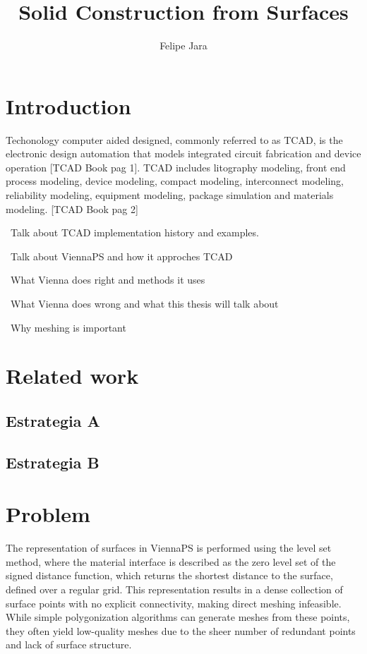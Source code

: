 \documentclass[submission]{eptcs}
\title{Solid Construction from Surfaces}
\author{ Felipe Jara
\institute{Department of Computer Science\\
University of Chile\\
Santiago, Chile}
\email{fjararibet@gmail.com}
}
\begin{document}
\maketitle

\section{Introduction}

Techonology computer aided designed, commonly referred to as TCAD, is the electronic design automation that models integrated circuit fabrication and device operation [TCAD Book pag 1]. TCAD includes litography modeling, front end process modeling, device modeling, compact modeling, interconnect modeling, reliability modeling, equipment modeling, package simulation and materials modeling. [TCAD Book pag 2]

~Talk about TCAD implementation history and examples.

~Talk about ViennaPS and how it approches TCAD

~What Vienna does right and methods it uses

~What Vienna does wrong and what this thesis will talk about

~Why meshing is important


\section{Related work}



\subsection{ Estrategia  A}




\subsection{ Estrategia B}


\section{Problem}

The representation of surfaces in ViennaPS is performed using the level set method, where the material interface is described as the zero level set of the signed distance function, which returns the shortest distance to the surface, defined over a regular grid. This representation results in a dense collection of surface points with no explicit connectivity, making direct meshing infeasible. While simple polygonization algorithms can generate meshes from these points, they often yield low-quality meshes due to the sheer number of redundant points and lack of surface structure.
\end{document}
